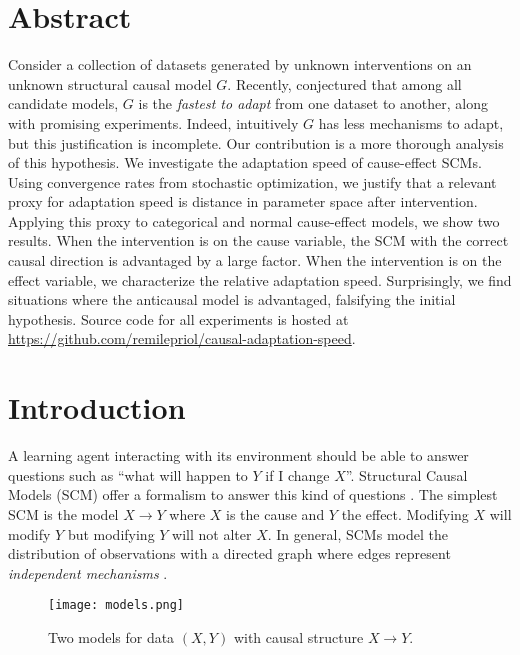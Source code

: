 \section*{Abstract}
Consider a collection of datasets generated by unknown interventions on an unknown structural causal model $G$.
Recently, \citet{bengio2019meta} conjectured that among all candidate models, $G$ is the \emph{fastest to adapt} from one dataset to another, along with promising experiments. 
Indeed, intuitively $G$ has less mechanisms to adapt, but this justification is incomplete.
Our contribution is a more thorough analysis of this hypothesis.
We investigate the adaptation speed of cause-effect SCMs.
Using convergence rates from stochastic optimization, we justify that a relevant proxy for adaptation speed is distance in parameter space after intervention.
Applying this proxy to categorical and normal cause-effect models, we show two results.
When the intervention is on the cause variable, the SCM with the correct causal direction is advantaged by a large factor.
When the intervention is on the effect variable, we characterize the relative adaptation speed. 
Surprisingly, we find situations where the anticausal model is advantaged, falsifying the initial hypothesis.
Source code for all experiments is hosted at 
\url{https://github.com/remilepriol/causal-adaptation-speed}.


\section{Introduction}

A learning agent interacting with its environment should be able to answer questions such as ``what will happen to $Y$ if I change $X$''.
Structural Causal Models (SCM) offer a formalism to answer this kind of questions \citep{pearl2009causality,peters2017elements}. 
The simplest SCM is the model $X\rightarrow Y$ where $X$ is the cause and $Y$ the effect.
Modifying $X$ will modify $Y$ but modifying $Y$ will not alter $X$.
In general, SCMs model the distribution of observations with a directed graph where edges represent \textit{independent mechanisms} \citep{janzing2010causal}.

\begin{wrapfigure}[6]{l}{.5\textwidth} 
    \centering
    \texttt{[image: models.png]}
    \caption{Two models for data $(X, Y)$ with causal structure $X\rightarrow Y$.}
    \label{fig:cause-effect}
\end{wrapfigure}

